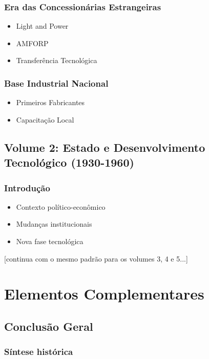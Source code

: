 \documentclass[12pt,a4paper]{report}
\begin{document}
\section{Era das Concessionárias Estrangeiras}
\begin{itemize}[leftmargin=*]
    \item Light and Power
    \item AMFORP
    \item Transferência Tecnológica
\end{itemize}

\section{Base Industrial Nacional}
\begin{itemize}[leftmargin=*]
    \item Primeiros Fabricantes
    \item Capacitação Local
\end{itemize}

\chapter{Volume 2: Estado e Desenvolvimento Tecnológico (1930-1960)}

\section{Introdução}
\begin{itemize}[leftmargin=*]
    \item Contexto político-econômico
    \item Mudanças institucionais
    \item Nova fase tecnológica
\end{itemize}

[continua com o mesmo padrão para os volumes 3, 4 e 5...]

\part{Elementos Complementares}

\chapter{Conclusão Geral}
\section{Síntese histórica}
\end{document}

